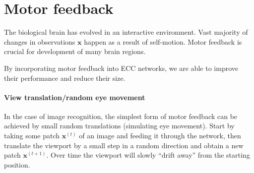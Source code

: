 \documentclass[12pt]{article}
\begin{document}
\section{Motor feedback}

The biological brain has evolved in an interactive environment. Vast majority of changes in observations $\boldsymbol{x}$ happen as a result of self-motion. Motor feedback is crucial for development of many brain regions.

By incorporating motor feedback into ECC networks, we are able to improve their performance and reduce their size.

\paragraph{View translation/random eye movement} 

 In the case of image recognition, the simplest form of motor feedback can be achieved by small random translations (simulating eye movement). Start by taking some patch $\boldsymbol{x}^{(t)}$ of an image and feeding it through the network, then translate the viewport by a small step in a random direction and obtain a new patch $\boldsymbol{x}^{(t+1)}$. Over time the viewport will slowly ``drift away'' from the starting position.
\end{document}
